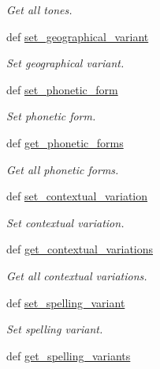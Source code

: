 \begin{DoxyCompactItemize}
\begin{DoxyCompactList}\small\item\em Get all tones. \end{DoxyCompactList}\item 
def \hyperlink{classlmf_1_1src_1_1morphology_1_1lemma_1_1_lemma_a4df66dfca0f2cdf379fa8782d86ba05f}{set\+\_\+geographical\+\_\+variant}
\begin{DoxyCompactList}\small\item\em Set geographical variant. \end{DoxyCompactList}\item 
def \hyperlink{classlmf_1_1src_1_1morphology_1_1lemma_1_1_lemma_ae14b90791332a8d5522ac5056ae2842f}{set\+\_\+phonetic\+\_\+form}
\begin{DoxyCompactList}\small\item\em Set phonetic form. \end{DoxyCompactList}\item 
def \hyperlink{classlmf_1_1src_1_1morphology_1_1lemma_1_1_lemma_af0a2868094d8121b389138319034f164}{get\+\_\+phonetic\+\_\+forms}
\begin{DoxyCompactList}\small\item\em Get all phonetic forms. \end{DoxyCompactList}\item 
def \hyperlink{classlmf_1_1src_1_1morphology_1_1lemma_1_1_lemma_a9f80f34789351b4d3b55c344acb19562}{set\+\_\+contextual\+\_\+variation}
\begin{DoxyCompactList}\small\item\em Set contextual variation. \end{DoxyCompactList}\item 
def \hyperlink{classlmf_1_1src_1_1morphology_1_1lemma_1_1_lemma_a54b9c3f2ae876fdb93b4c4676403c1f0}{get\+\_\+contextual\+\_\+variations}
\begin{DoxyCompactList}\small\item\em Get all contextual variations. \end{DoxyCompactList}\item 
def \hyperlink{classlmf_1_1src_1_1morphology_1_1lemma_1_1_lemma_a01bba6d5da1c9c0d70a3faf762d24f7c}{set\+\_\+spelling\+\_\+variant}
\begin{DoxyCompactList}\small\item\em Set spelling variant. \end{DoxyCompactList}\item 
def \hyperlink{classlmf_1_1src_1_1morphology_1_1lemma_1_1_lemma_a13fb86a829741554939046f500409327}{get\+\_\+spelling\+\_\+variants}

\end{DoxyCompactItemize}
